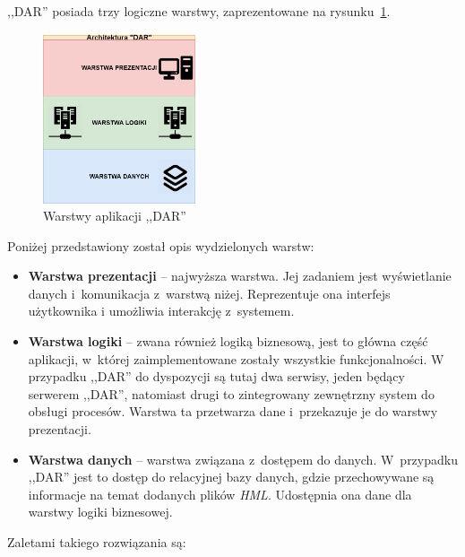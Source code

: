 ,,DAR'' posiada trzy logiczne warstwy, zaprezentowane na rysunku~\ref{fig:layerExample}.
\begin{figure}
    \centering
    \includegraphics[width=0.4\textwidth,height=0.4\textheight,keepaspectratio]{./assets/layerExample.png}
    \caption{Warstwy aplikacji ,,DAR''}
    \label{fig:layerExample}
\end{figure} 
Poniżej przedstawiony został opis wydzielonych warstw:
\begin{itemize}
    \item \textbf{Warstwa prezentacji} -- najwyższa warstwa. Jej zadaniem jest wyświetlanie danych i~komunikacja z~warstwą niżej. Reprezentuje ona interfejs użytkownika i umożliwia interakcję z~systemem.
    \item \textbf{Warstwa logiki} -- zwana również logiką biznesową, jest to główna część aplikacji, w~której zaimplementowane zostały wszystkie funkcjonalności. W przypadku ,,DAR'' do dyspozycji są tutaj dwa serwisy, jeden będący serwerem ,,DAR'', natomiast drugi to zintegrowany zewnętrzny system do obsługi procesów. Warstwa ta przetwarza dane i~przekazuje je do warstwy prezentacji. 
    \item \textbf{Warstwa danych} -- warstwa związana z~dostępem do danych. W~przypadku ,,DAR'' jest to dostęp do relacyjnej bazy danych, gdzie przechowywane są informacje na temat dodanych plików \emph{HML}. Udostępnia ona dane dla warstwy logiki biznesowej.
\end{itemize}
Zaletami takiego rozwiązania są:
